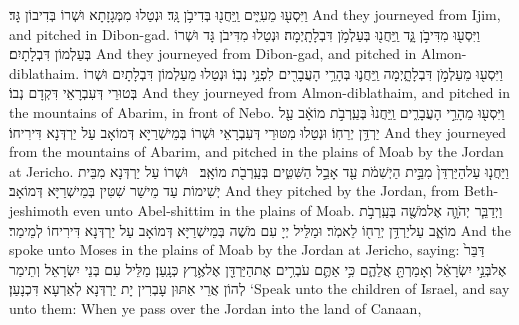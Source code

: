 {וַיִּסְע֖וּ מֵעִיִּ֑ים וַֽיַּחֲנ֖וּ בְּדִיבֹ֥ן גָּֽד׃}
{וּנְטַלוּ מִמְּגָזָתָא וּשְׁרוֹ בְּדִיבוֹן גָּד׃}
{And they journeyed from Ijim, and pitched in Dibon-gad.}{}
{וַיִּסְע֖וּ מִדִּיבֹ֣ן גָּ֑ד וַֽיַּחֲנ֖וּ בְּעַלְמֹ֥ן דִּבְלָתָֽיְמָה׃}
{וּנְטַלוּ מִדִּיבֹן גָּד וּשְׁרוֹ בְּעַלְמוֹן דִּבְלָתָיִם׃}
{And they journeyed from Dibon-gad, and pitched in Almon-diblathaim.}{}
{וַיִּסְע֖וּ מֵעַלְמֹ֣ן דִּבְלָתָ֑יְמָה וַֽיַּחֲנ֛וּ בְּהָרֵ֥י הָעֲבָרִ֖ים לִפְנֵ֥י נְבֽוֹ׃}
{וּנְטַלוּ מֵעַלְמוֹן דִּבְלָתָיִם וּשְׁרוֹ בְּטוּרֵי דְּעִבְרָאֵי דִּקְדָם נְבוֹ׃}
{And they journeyed from Almon-diblathaim, and pitched in the mountains of Abarim, in front of Nebo.}{}
{וַיִּסְע֖וּ מֵהָרֵ֣י הָעֲבָרִ֑ים וַֽיַּחֲנוּ֙ בְּעַֽרְבֹ֣ת מוֹאָ֔ב עַ֖ל יַרְדֵּ֥ן יְרֵחֽוֹ׃}
{וּנְטַלוּ מִטּוּרֵי דְּעִבְרָאֵי וּשְׁרוֹ בְּמֵישְׁרַיָּא דְּמוֹאָב עַל יַרְדְּנָא דִּירִיחוֹ׃}
{And they journeyed from the mountains of Abarim, and pitched in the plains of Moab by the Jordan at Jericho.}{}
{וַיַּחֲנ֤וּ עַל\maqqaf הַיַּרְדֵּן֙ מִבֵּ֣ית הַיְשִׁמֹ֔ת עַ֖ד אָבֵ֣ל הַשִּׁטִּ֑ים בְּעַֽרְבֹ֖ת מוֹאָֽב׃ \setuma }
{וּשְׁרוֹ עַל יַרְדְּנָא מִבֵּית יְשִׁימוֹת עַד מֵישַׁר שִׁטִּין בְּמֵישְׁרַיָּא דְּמוֹאָב׃}
{And they pitched by the Jordan, from Beth-jeshimoth even unto Abel-shittim in the plains of Moab.}{}
{וַיְדַבֵּ֧ר יְהֹוָ֛ה אֶל\maqqaf מֹשֶׁ֖ה בְּעַֽרְבֹ֣ת מוֹאָ֑ב עַל\maqqaf יַרְדֵּ֥ן יְרֵח֖וֹ לֵאמֹֽר׃}
{וּמַלֵּיל יְיָ עִם מֹשֶׁה בְּמֵישְׁרַיָּא דְּמוֹאָב עַל יַרְדְּנָא דִּירִיחוֹ לְמֵימַר׃}
{And the \lord\space spoke unto Moses in the plains of Moab by the Jordan at Jericho, saying:}{}
{דַּבֵּר֙ אֶל\maqqaf בְּנֵ֣י יִשְׂרָאֵ֔ל וְאָמַרְתָּ֖ אֲלֵהֶ֑ם כִּ֥י אַתֶּ֛ם עֹבְרִ֥ים אֶת\maqqaf הַיַּרְדֵּ֖ן אֶל\maqqaf אֶ֥רֶץ כְּנָֽעַן׃}
{מַלֵּיל עִם בְּנֵי יִשְׂרָאֵל וְתֵימַר לְהוֹן אֲרֵי אַתּוּן עָבְרִין יָת יַרְדְּנָא לְאַרְעָא דִּכְנָעַן׃}
{‘Speak unto the children of Israel, and say unto them: When ye pass over the Jordan into the land of Canaan,}{}
